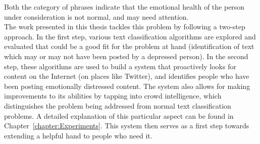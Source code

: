 Both the category of phrases indicate that the emotional health of the person under consideration is not normal, and may need attention.\\

The work presented in this thesis tackles this problem by following a two-step approach. In the first step, various text classification algorithms are explored and evaluated that could be a good fit for the problem at hand (identification of text which may or may not have been posted by a depressed person). In the second step, these algorithms are used to build a system that proactively looks for content on the Internet (on places like Twitter), and identifies people who have been posting emotionally distressed content. The system also allows for making improvements to its abilities by tapping into crowd intelligence, which distinguishes the problem being addressed from normal text classification problems. A detailed explanation of this particular aspect can be found in Chapter~\ref{chapter:Experiments}. This system then serves as a first step towards extending a helpful hand to people who need it.
